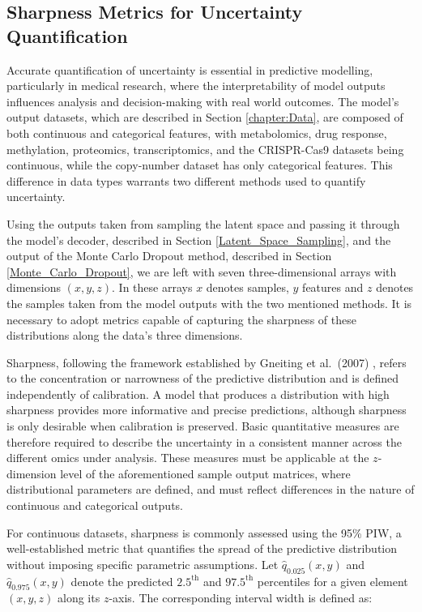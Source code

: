 \subsection{Sharpness Metrics for Uncertainty Quantification} \label{Sharpness}


Accurate quantification of uncertainty is essential in predictive modelling, particularly in medical research, where the interpretability of model outputs influences analysis and decision-making with real world outcomes. The model's output datasets, which are described in Section \ref{chapter:Data}, are composed of both continuous and categorical features, with metabolomics, drug response, methylation, proteomics, transcriptomics, and the CRISPR-Cas9 datasets being continuous, while the copy-number dataset has only categorical features. This difference in data types warrants two different methods used to quantify uncertainty.

Using the outputs taken from sampling the latent space and passing it through the model's decoder, described in Section \ref{Latent_Space_Sampling}, and the output of the Monte Carlo Dropout method, described in Section \ref{Monte_Carlo_Dropout}, we are left with seven three-dimensional arrays with dimensions $(x, y, z)$. In these arrays $x$ denotes samples, $y$ features and $z$ denotes the samples taken from the model outputs with the two mentioned methods. It is necessary to adopt metrics capable of capturing the sharpness of these distributions along the data's three dimensions.

Sharpness, following the framework established by Gneiting et al.\ (2007) \citep{Gneiting2007Calibration}, refers to the concentration or narrowness of the predictive distribution and is defined independently of calibration. A model that produces a distribution with high sharpness provides more informative and precise predictions, although sharpness is only desirable when calibration is preserved. Basic quantitative measures are therefore required to describe the uncertainty in a consistent manner across the different omics under analysis. These measures must be applicable at the $z$-dimension level of the aforementioned sample output matrices, where distributional parameters are defined, and must reflect differences in the nature of continuous and categorical outputs.

For continuous datasets, sharpness is commonly assessed using the 95\% \gls{PIW}, a well-established metric that quantifies the spread of the predictive distribution without imposing specific parametric assumptions. Let $\hat{q}_{0.025}(x,y)$ and $\hat{q}_{0.975}(x,y)$ denote the predicted $2.5^{\text{th}}$ and $97.5^{\text{th}}$ percentiles for a given element $(x, y, z)$ along its $z$-axis. The corresponding interval width is defined as:

